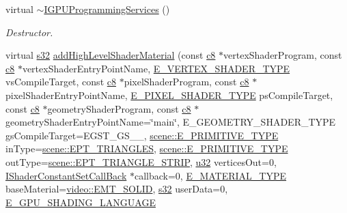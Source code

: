 \begin{DoxyCompactItemize}
\item 
\mbox{\label{classirr_1_1video_1_1IGPUProgrammingServices_a09d143ea5c55840c15ebcb84e8539bc0}} 
virtual \hyperlink{classirr_1_1video_1_1IGPUProgrammingServices_a09d143ea5c55840c15ebcb84e8539bc0}{$\sim$\+I\+G\+P\+U\+Programming\+Services} ()
\begin{DoxyCompactList}\small\item\em Destructor. \end{DoxyCompactList}\item 
virtual \hyperlink{namespaceirr_ac66849b7a6ed16e30ebede579f9b47c6}{s32} \hyperlink{classirr_1_1video_1_1IGPUProgrammingServices_a4a8d3b727ee9223d8baa353b82da0478}{add\+High\+Level\+Shader\+Material} (const \hyperlink{namespaceirr_a9395eaea339bcb546b319e9c96bf7410}{c8} $\ast$vertex\+Shader\+Program, const \hyperlink{namespaceirr_a9395eaea339bcb546b319e9c96bf7410}{c8} $\ast$vertex\+Shader\+Entry\+Point\+Name, \hyperlink{namespaceirr_1_1video_a9decae50d4dc2455e7b009f5c71b24f9}{E\+\_\+\+V\+E\+R\+T\+E\+X\+\_\+\+S\+H\+A\+D\+E\+R\+\_\+\+T\+Y\+PE} vs\+Compile\+Target, const \hyperlink{namespaceirr_a9395eaea339bcb546b319e9c96bf7410}{c8} $\ast$pixel\+Shader\+Program, const \hyperlink{namespaceirr_a9395eaea339bcb546b319e9c96bf7410}{c8} $\ast$pixel\+Shader\+Entry\+Point\+Name, \hyperlink{namespaceirr_1_1video_a07fb77e9aec681402ad376f7ef9b724c}{E\+\_\+\+P\+I\+X\+E\+L\+\_\+\+S\+H\+A\+D\+E\+R\+\_\+\+T\+Y\+PE} ps\+Compile\+Target, const \hyperlink{namespaceirr_a9395eaea339bcb546b319e9c96bf7410}{c8} $\ast$geometry\+Shader\+Program, const \hyperlink{namespaceirr_a9395eaea339bcb546b319e9c96bf7410}{c8} $\ast$geometry\+Shader\+Entry\+Point\+Name=\char`\"{}main\char`\"{}, E\+\_\+\+G\+E\+O\+M\+E\+T\+R\+Y\+\_\+\+S\+H\+A\+D\+E\+R\+\_\+\+T\+Y\+PE gs\+Compile\+Target=E\+G\+S\+T\+\_\+\+G\+S\+\_\+\_, \hyperlink{namespaceirr_1_1scene_a5d7de82f2169761194b2f44d95cdc1dc}{scene\+::\+E\+\_\+\+P\+R\+I\+M\+I\+T\+I\+V\+E\+\_\+\+T\+Y\+PE} in\+Type=\hyperlink{namespaceirr_1_1scene_a5d7de82f2169761194b2f44d95cdc1dca237fc76e4b259febd27b4b84066ca581}{scene\+::\+E\+P\+T\+\_\+\+T\+R\+I\+A\+N\+G\+L\+ES}, \hyperlink{namespaceirr_1_1scene_a5d7de82f2169761194b2f44d95cdc1dc}{scene\+::\+E\+\_\+\+P\+R\+I\+M\+I\+T\+I\+V\+E\+\_\+\+T\+Y\+PE} out\+Type=\hyperlink{namespaceirr_1_1scene_a5d7de82f2169761194b2f44d95cdc1dcaef19e8b586de395af81c8cd9851a1b40}{scene\+::\+E\+P\+T\+\_\+\+T\+R\+I\+A\+N\+G\+L\+E\+\_\+\+S\+T\+R\+IP}, \hyperlink{namespaceirr_a0416a53257075833e7002efd0a18e804}{u32} vertices\+Out=0, \hyperlink{classirr_1_1video_1_1IShaderConstantSetCallBack}{I\+Shader\+Constant\+Set\+Call\+Back} $\ast$callback=0, \hyperlink{namespaceirr_1_1video_ac8e9b6c66f7cebabd1a6d30cbc5430f1}{E\+\_\+\+M\+A\+T\+E\+R\+I\+A\+L\+\_\+\+T\+Y\+PE} base\+Material=\hyperlink{namespaceirr_1_1video_ac8e9b6c66f7cebabd1a6d30cbc5430f1a9bc471b9c18c9e2d20496004d2a2e803}{video\+::\+E\+M\+T\+\_\+\+S\+O\+L\+ID}, \hyperlink{namespaceirr_ac66849b7a6ed16e30ebede579f9b47c6}{s32} user\+Data=0, \hyperlink{namespaceirr_1_1video_a913671e32f20f13e51336bfbe20a82a3}{E\+\_\+\+G\+P\+U\+\_\+\+S\+H\+A\+D\+I\+N\+G\+\_\+\+L\+A\+N\+G\+U\+A\+GE} 
\end{DoxyCompactItemize}
